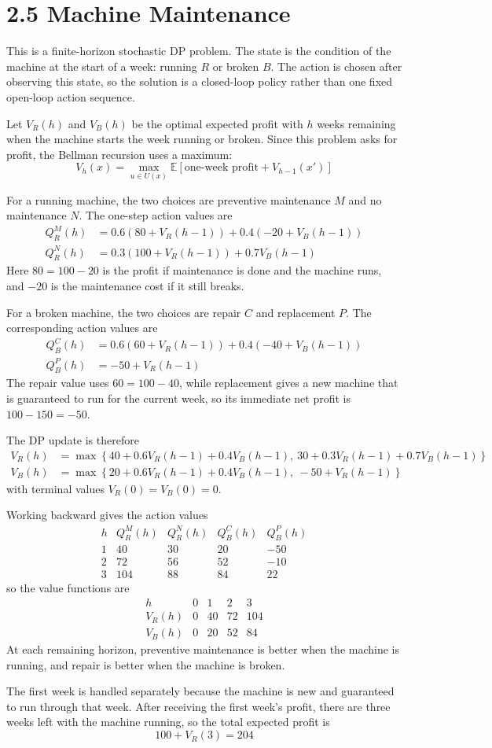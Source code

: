 \section*{2.5 Machine Maintenance}

This is a finite-horizon stochastic DP problem. The state is the condition of the machine at the start of a week:
running \(R\) or broken \(B\). The action is chosen after observing this state,
so the solution is a closed-loop policy rather than one fixed open-loop action
sequence.

Let \(V_R(h)\) and \(V_B(h)\) be the optimal expected profit with \(h\) weeks
remaining when the machine starts the week running or broken. Since this
problem asks for profit, the Bellman recursion uses a maximum:
\[
V_h(x)=\max_{u\in U(x)}\mathbb E\left[
    \text{one-week profit}+V_{h-1}(x')
\right]
\]

For a running machine, the two choices are preventive maintenance \(M\) and no
maintenance \(N\). The one-step action values are
\[
\begin{aligned}
Q_R^M(h)&=0.6\left(80+V_R(h-1)\right)
        +0.4\left(-20+V_B(h-1)\right)\\
Q_R^N(h)&=0.3\left(100+V_R(h-1)\right)
        +0.7V_B(h-1)
\end{aligned}
\]
Here \(80=100-20\) is the profit if maintenance is done and the machine runs,
and \(-20\) is the maintenance cost if it still breaks.

For a broken machine, the two choices are repair \(C\) and replacement \(P\).
The corresponding action values are
\[
\begin{aligned}
Q_B^C(h)&=0.6\left(60+V_R(h-1)\right)
        +0.4\left(-40+V_B(h-1)\right)\\
Q_B^P(h)&=-50+V_R(h-1)
\end{aligned}
\]
The repair value uses \(60=100-40\), while replacement gives a new machine
that is guaranteed to run for the current week, so its immediate net profit is
\(100-150=-50\).

The DP update is therefore
\[
\begin{aligned}
V_R(h)&=\max\left\{
40+0.6V_R(h-1)+0.4V_B(h-1),\
30+0.3V_R(h-1)+0.7V_B(h-1)
\right\}\\
V_B(h)&=\max\left\{
20+0.6V_R(h-1)+0.4V_B(h-1),\
-50+V_R(h-1)
\right\}
\end{aligned}
\]
with terminal values \(V_R(0)=V_B(0)=0\).

Working backward gives the action values
\[
\begin{array}{c|cc|cc}
h & Q_R^M(h) & Q_R^N(h) & Q_B^C(h) & Q_B^P(h)\\
\hline
1 & 40 & 30 & 20 & -50\\
2 & 72 & 56 & 52 & -10\\
3 & 104 & 88 & 84 & 22
\end{array}
\]
so the value functions are
\[
\begin{array}{c|cccc}
h&0&1&2&3\\
\hline
V_R(h)&0&40&72&104\\
V_B(h)&0&20&52&84
\end{array}
\]
At each remaining horizon, preventive maintenance is better when the machine is
running, and repair is better when the machine is broken.

The first week is handled separately because the machine is new and guaranteed
to run through that week. After receiving the first week's profit, there are
three weeks left with the machine running, so the total expected profit is
\[
    \boxed{100+V_R(3)=204}
\]
